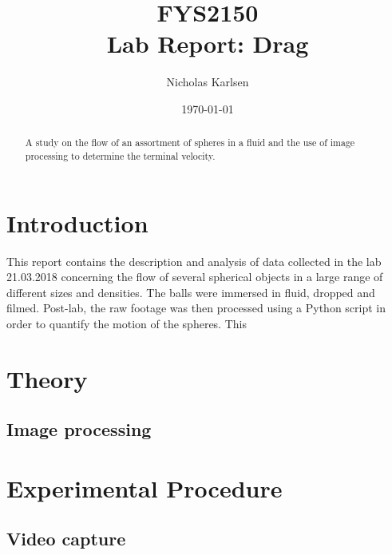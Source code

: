 \documentclass[11pt,a4paper]{article}
\begin{document}

\title{FYS2150 \\ Lab Report: Drag}%

\author{Nicholas Karlsen}

\date{\today}%

\maketitle

\begin{abstract}
  A study on the flow of an assortment of spheres in a fluid and the use of image processing to determine the terminal velocity.
\end{abstract}


\section{\label{sect:intro}Introduction}
  This report contains the description and analysis of data collected in the lab 21.03.2018 concerning the flow of several spherical objects in a large range of different sizes and densities. The balls were immersed in fluid, dropped and filmed. Post-lab, the raw footage was then processed using a Python script in order to quantify the motion of the spheres. This 

\section{\label{sect:theory}Theory}

  \subsection{Image processing\label{sect:imgpro}}

\section{\label{section:experimental}Experimental Procedure} 
  
  \subsection{Video capture\label{subsect:vidcap}}
    
\end{document}
